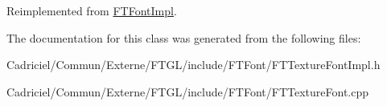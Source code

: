 Reimplemented from \hyperlink{class_f_t_font_impl}{F\+T\+Font\+Impl}.



The documentation for this class was generated from the following files\+:\begin{DoxyCompactItemize}
\item 
Cadriciel/\+Commun/\+Externe/\+F\+T\+G\+L/include/\+F\+T\+Font/F\+T\+Texture\+Font\+Impl.\+h\item 
Cadriciel/\+Commun/\+Externe/\+F\+T\+G\+L/include/\+F\+T\+Font/F\+T\+Texture\+Font.\+cpp\end{DoxyCompactItemize}
